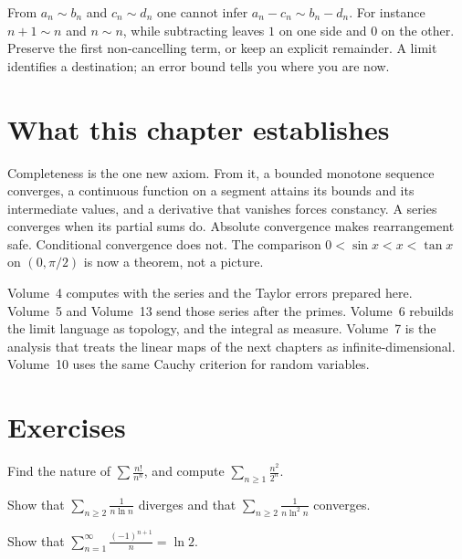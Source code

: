 \begin{reminder}
From $a_n\sim b_n$ and $c_n\sim d_n$ one cannot infer $a_n-c_n\sim b_n-d_n$. For instance $n+1\sim n$ and $n\sim n$, while subtracting leaves $1$ on one side and $0$ on the other. Preserve the first non-cancelling term, or keep an explicit remainder. A limit identifies a destination; an error bound tells you where you are now.
\end{reminder}

\section*{What this chapter establishes}
Completeness is the one new axiom. From it, a bounded monotone sequence converges, a continuous function on a segment attains its bounds and its intermediate values, and a derivative that vanishes forces constancy. A series converges when its partial sums do. Absolute convergence makes rearrangement safe. Conditional convergence does not. The comparison $0<\sin x<x<\tan x$ on $(0,\pi/2)$ is now a theorem, not a picture.

Volume~4 computes with the series and the Taylor errors prepared here. Volume~5 and Volume~13 send those series after the primes. Volume~6 rebuilds the limit language as topology, and the integral as measure. Volume~7 is the analysis that treats the linear maps of the next chapters as infinite-dimensional. Volume~10 uses the same Cauchy criterion for random variables.

\section{Exercises}

\begin{exercise}[$\star$]\label{ex:nature}
Find the nature of $\sum\frac{n!}{n^n}$, and compute $\sum_{n\ge1}\frac{n^2}{2^n}$.
\end{exercise}

\begin{exercise}[$\star$]\label{ex:bertrand}
Show that $\sum_{n\ge2}\frac1{n\ln n}$ diverges and that $\sum_{n\ge2}\frac1{n\ln^2n}$ converges.
\end{exercise}

\begin{exercise}[$\star\star$]\label{ex:ln2}
Show that $\displaystyle\sum_{n=1}^\infty\frac{(-1)^{n+1}}n=\ln2$.
\end{exercise}

